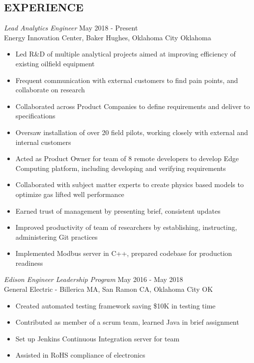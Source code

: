 \documentclass[line,margin]{res}
\begin{document}
\begin{resume}
	\section{EXPERIENCE}
	 {\sl Lead Analytics Engineer} \hfill May 2018 - Present \\
	Energy Innovation Center, Baker Hughes, Oklahoma City Oklahoma
	\begin{itemize} \itemsep -2pt
		\item Led R\&D of multiple analytical projects aimed at improving efficiency of existing oilfield equipment
		\item Frequent communication with external customers to find pain points, and collaborate on research
		\item Collaborated across Product Companies to define requirements and deliver to specifications
		\item Oversaw installation of over 20 field pilots, working closely with external and internal customers
		\item Acted as Product Owner for team of 8 remote developers to develop Edge Computing platform, including developing and verifying requirements
		\item Collaborated with subject matter experts to create physics based models to optimize gas lifted well performance
		\item Earned trust of management by presenting brief, consistent updates
		\item Improved productivity of team of researchers by establishing, instructing, administering Git practices
		\item Implemented Modbus server in C++, prepared codebase for production readiness
	\end{itemize}
	{\sl Edison Engineer Leadership Program} \hfill May 2016 - May 2018\\
	General Electric - Billerica MA, San Ramon CA, Oklahoma City OK
	\begin{itemize} \itemsep -2pt
		\item Created automated testing framework saving \$10K in testing time
		\item Contributed as member of a scrum team, learned Java in brief assignment
		\item Set up Jenkins Continuous Integration server for team
		\item Assisted in RoHS compliance of electronics
	\end{itemize}


\end{resume}
\end{document}
